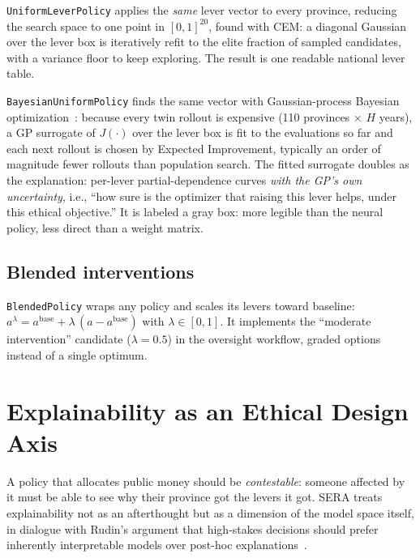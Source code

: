 \documentclass[11pt,a4paper]{article}
\newcommand{\code}[1]{\texttt{#1}}
\begin{document}
\code{UniformLeverPolicy} applies the \emph{same} lever vector to every
province, reducing the search space to one point in $[0,1]^{20}$, found with
CEM: a diagonal Gaussian over the lever box is iteratively refit to the elite
fraction of sampled candidates, with a variance floor to keep exploring. The
result is one readable national lever table.

\code{BayesianUniformPolicy} finds the same vector with Gaussian-process
Bayesian optimization~\cite{frazier2018}: because every twin rollout is
expensive (110 provinces $\times$ $H$ years), a GP surrogate of
$J(\cdot)$ over the lever box is fit to the evaluations so far and each next
rollout is chosen by Expected Improvement, typically an order of magnitude
fewer rollouts than population search. The fitted surrogate doubles as the
explanation: per-lever partial-dependence curves \emph{with the GP's own
uncertainty}, i.e., ``how sure is the optimizer that raising this lever helps,
under this ethical objective.'' It is labeled a gray box: more legible than the
neural policy, less direct than a weight matrix.

\subsection{Blended interventions}

\code{BlendedPolicy} wraps any policy and scales its levers toward baseline:
$a^{\lambda} = a^{\text{base}} + \lambda\,(a - a^{\text{base}})$ with $\lambda
\in [0,1]$. It implements the ``moderate intervention'' candidate
($\lambda = 0.5$) in the oversight workflow, graded options instead of a
single optimum.

\section{Explainability as an Ethical Design Axis}
\label{sec:explain}

A policy that allocates public money should be \emph{contestable}: someone
affected by it must be able to see why their province got the levers it got.
SERA treats explainability not as an afterthought but as a dimension of the
model space itself, in dialogue with Rudin's argument that high-stakes
decisions should prefer inherently interpretable models over post-hoc
explanations~\cite{rudin2019}.
\end{document}
